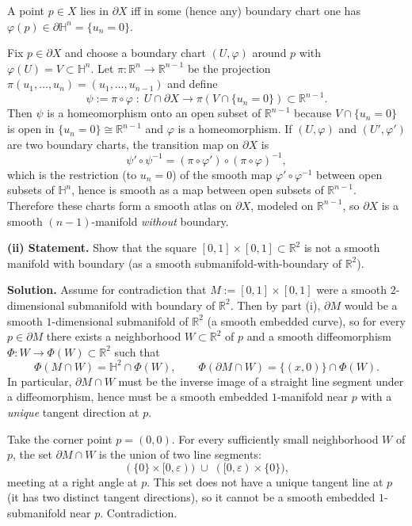 \documentclass[12pt,a4paper]{article}
\theoremstyle{plain}
\theoremstyle{definition}      %
\begin{document}
A point $p\in X$ lies in $\partial X$ iff in some (hence any) boundary chart one has
$\varphi(p)\in \partial\mathbb{H}^n=\{u_n=0\}$.

Fix $p\in \partial X$ and choose a boundary chart $(U,\varphi)$ around $p$ with
$\varphi(U)=V\subset \mathbb{H}^n$. Let $\pi:\mathbb{R}^n\to\mathbb{R}^{n-1}$ be the projection
$\pi(u_1,\dots,u_n)=(u_1,\dots,u_{n-1})$ and define
\[
\psi := \pi\circ \varphi \;:\; U\cap \partial X \longrightarrow \pi(V\cap \{u_n=0\}) \subset \mathbb{R}^{n-1}.
\]
Then $\psi$ is a homeomorphism onto an open subset of $\mathbb{R}^{n-1}$ because
$V\cap\{u_n=0\}$ is open in $\{u_n=0\}\cong \mathbb{R}^{n-1}$ and $\varphi$ is a homeomorphism.
If $(U,\varphi)$ and $(U',\varphi')$ are two boundary charts, the transition map on $\partial X$ is
\[
\psi'\circ \psi^{-1}
= (\pi\circ \varphi')\circ (\pi\circ \varphi)^{-1},
\]
which is the restriction (to $u_n=0$) of the smooth map $\varphi'\circ \varphi^{-1}$ between open subsets of
$\mathbb{H}^n$, hence is smooth as a map between open subsets of $\mathbb{R}^{n-1}$.
Therefore these charts form a smooth atlas on $\partial X$, modeled on $\mathbb{R}^{n-1}$,
so $\partial X$ is a smooth $(n-1)$-manifold \emph{without} boundary.

\bigskip
\textbf{(ii) Statement.} Show that the square $[0,1]\times[0,1]\subset \mathbb{R}^2$ is not a smooth manifold with boundary
(as a smooth submanifold-with-boundary of $\mathbb{R}^2$).

\medskip
\noindent\textbf{Solution.}
Assume for contradiction that $M:=[0,1]\times[0,1]$ were a smooth $2$-dimensional submanifold with boundary of $\mathbb{R}^2$.
Then by part (i), $\partial M$ would be a smooth $1$-dimensional submanifold of $\mathbb{R}^2$ (a smooth embedded curve),
so for every $p\in \partial M$ there exists a neighborhood $W\subset \mathbb{R}^2$ of $p$ and a smooth diffeomorphism
$\Phi:W\to \Phi(W)\subset \mathbb{R}^2$ such that
\[
\Phi(M\cap W) = \mathbb{H}^2\cap \Phi(W), \qquad
\Phi(\partial M\cap W)=\{(x,0)\}\cap \Phi(W).
\]
In particular, $\partial M\cap W$ must be the inverse image of a straight line segment under a diffeomorphism,
hence must be a smooth embedded $1$-manifold near $p$ with a \emph{unique} tangent direction at $p$.

Take the corner point $p=(0,0)$. For every sufficiently small neighborhood $W$ of $p$,
the set $\partial M\cap W$ is the union of two line segments:
\[
(\{0\}\times[0,\varepsilon)) \;\cup\; ([0,\varepsilon)\times\{0\}),
\]
meeting at a right angle at $p$. This set does not have a unique tangent line at $p$ (it has two distinct tangent directions),
so it cannot be a smooth embedded $1$-submanifold near $p$. Contradiction.
\end{document}
